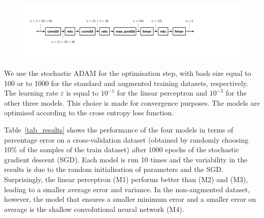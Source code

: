 \documentclass{article}
\begin{document}
\begin{figure}[h!]
\centering
\includegraphics[width=\textwidth, clip=true,trim=80 200 520 200]{fig/conv3.pdf}
\end{figure}



We use the stochastic ADAM for the optimisation step, with bash size equal to 100 or to 1000  for the standard and augmented training datasets, respectively. 
The learning rate $\varepsilon$ is equal to  $10^{-1}$ for the linear perceptron and $10^{-3}$ for the other three models. 
This choice is made  for convergence purposes. 
The models are optimised according to the cross entropy loss function. 

Table~\ref{tab_results} shows the performance of the four models in terms of percentage error on a cross-validation dataset (obtained by randomly choosing 10\% of the samples of the train dataset) after 1000 epochs of the stochastic gradient descent (SGD). 
Each model is run 10 times and the variability in the results is due to the random initialisation of parameters and the SGD.
Surprisingly, the linear perceptron (M1) performs better than (M2) and (M3), leading to a smaller average error and variance. 
In the non-augmented dataset, however, the model that ensures a smaller minimum error and a smaller error on average is the shallow convolutional neural network (M4).
\end{document}
